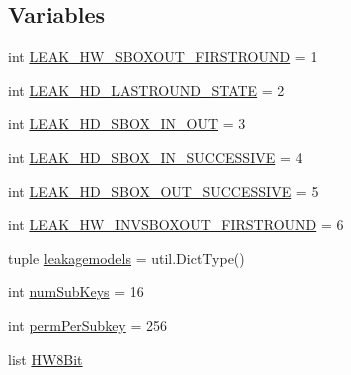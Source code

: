 \subsection*{Variables}
\begin{DoxyCompactItemize}
\item 
int \hyperlink{namespacesoftware_1_1chipwhisperer_1_1analyzer_1_1attacks_1_1models_1_1AES128__8bit_a2f3751465572d0233e51cf00f8c56fcc}{L\+E\+A\+K\+\_\+\+H\+W\+\_\+\+S\+B\+O\+X\+O\+U\+T\+\_\+\+F\+I\+R\+S\+T\+R\+O\+U\+N\+D} = 1
\item 
int \hyperlink{namespacesoftware_1_1chipwhisperer_1_1analyzer_1_1attacks_1_1models_1_1AES128__8bit_a9f862c9aa73c1b4f174f6411ceb13bb7}{L\+E\+A\+K\+\_\+\+H\+D\+\_\+\+L\+A\+S\+T\+R\+O\+U\+N\+D\+\_\+\+S\+T\+A\+T\+E} = 2
\item 
int \hyperlink{namespacesoftware_1_1chipwhisperer_1_1analyzer_1_1attacks_1_1models_1_1AES128__8bit_ac173615fbfe69731678b23890d51b9f5}{L\+E\+A\+K\+\_\+\+H\+D\+\_\+\+S\+B\+O\+X\+\_\+\+I\+N\+\_\+\+O\+U\+T} = 3
\item 
int \hyperlink{namespacesoftware_1_1chipwhisperer_1_1analyzer_1_1attacks_1_1models_1_1AES128__8bit_aa157d73e0f6c30fca0f223793d6349a5}{L\+E\+A\+K\+\_\+\+H\+D\+\_\+\+S\+B\+O\+X\+\_\+\+I\+N\+\_\+\+S\+U\+C\+C\+E\+S\+S\+I\+V\+E} = 4
\item 
int \hyperlink{namespacesoftware_1_1chipwhisperer_1_1analyzer_1_1attacks_1_1models_1_1AES128__8bit_ada60cdb0e2e50f212a32d1eff1490f05}{L\+E\+A\+K\+\_\+\+H\+D\+\_\+\+S\+B\+O\+X\+\_\+\+O\+U\+T\+\_\+\+S\+U\+C\+C\+E\+S\+S\+I\+V\+E} = 5
\item 
int \hyperlink{namespacesoftware_1_1chipwhisperer_1_1analyzer_1_1attacks_1_1models_1_1AES128__8bit_ad1c6071e513f3d14e3e83c7f73fc140e}{L\+E\+A\+K\+\_\+\+H\+W\+\_\+\+I\+N\+V\+S\+B\+O\+X\+O\+U\+T\+\_\+\+F\+I\+R\+S\+T\+R\+O\+U\+N\+D} = 6
\item 
tuple \hyperlink{namespacesoftware_1_1chipwhisperer_1_1analyzer_1_1attacks_1_1models_1_1AES128__8bit_aa1884fa8f182a3a465f0a4c2355b7cf1}{leakagemodels} = util.\+Dict\+Type()
\item 
int \hyperlink{namespacesoftware_1_1chipwhisperer_1_1analyzer_1_1attacks_1_1models_1_1AES128__8bit_acb8c2af6a81f7ddbb99b4d2e0f4bf65f}{num\+Sub\+Keys} = 16
\item 
int \hyperlink{namespacesoftware_1_1chipwhisperer_1_1analyzer_1_1attacks_1_1models_1_1AES128__8bit_a842b0fe06df25c7bd4e67ba777a94886}{perm\+Per\+Subkey} = 256
\item 
list \hyperlink{namespacesoftware_1_1chipwhisperer_1_1analyzer_1_1attacks_1_1models_1_1AES128__8bit_a2c5c921d3b44ad512e0cc55be1f4b301}{H\+W8\+Bit}

\end{DoxyCompactItemize}
